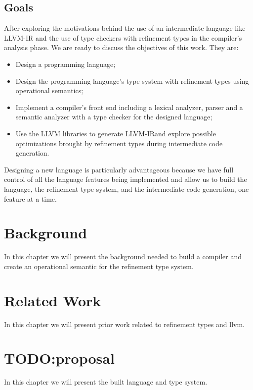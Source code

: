 \documentclass[
  english,
  lmodern,
  oneside
]{ufsc-thesis-rn46-2019/ufsc-thesis-rn46-2019}
\begin{document}
\section{Goals}\label{chapter:introduction:sec:goals}

After exploring the motivations behind the use of an intermediate language like LLVM-IR and the use of type checkers with refinement types in the compiler's analysis phase.
We are ready to discuss the objectives of this work.
They are:
\begin{itemize}
    \item Design a programming language;
    \item Design the programming language's type system with refinement types using operational semantics;
    \item Implement a compiler's front end including a lexical analyzer, parser and a semantic analyzer with a type checker for the designed language;
    \item Use the LLVM libraries to generate LLVM-IR\@ and explore possible optimizations brought by refinement types during intermediate code generation.
\end{itemize}

Designing a new language is particularly advantageous because we have full control of all the language features being implemented and allow us to build the language, the refinement type system, and the intermediate code generation, one feature at a time.

\chapter{Background}\label{chapter:background}

In this chapter we will present the background needed to build a compiler and create an operational semantic for the refinement type system.

\chapter{Related Work}\label{chapter:related_work}

In this chapter we will present prior work related to refinement types and llvm.

\chapter{TODO:\@ proposal}

In this chapter we will present the built language and type system.

\postextual{}


\apendices{}
\end{document}
